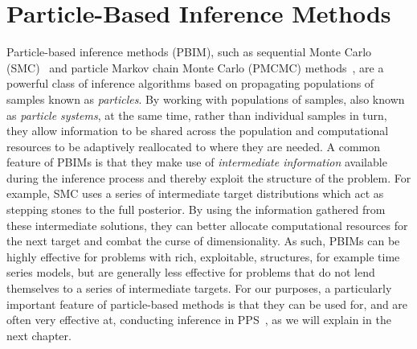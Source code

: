
\chapter{Particle-Based Inference Methods}
\label{chp:part}

Particle-based inference methods (PBIM), such as sequential Monte Carlo (SMC)~\citep{gordon1993novel,doucet2001introduction} and 
particle Markov chain Monte Carlo (PMCMC) methods~\citep{andrieu2009pseudo,rainforth2016interacting},
are a powerful class of inference algorithms based on propagating populations of samples
known as \emph{particles}.  By working with populations of samples, also known as \emph{particle systems},
 at the same time, rather than individual
samples in turn, they allow information to be shared across the population and computational
resources to be adaptively reallocated to where they are needed.  A common feature of PBIMs is
that they make use of \emph{intermediate information} available during the inference process and thereby
exploit the structure of the problem.  For example, SMC uses a series of intermediate target distributions
which act as stepping stones to the full posterior.  By using the information gathered from these intermediate
solutions, they can better allocate computational resources for the next target and combat the curse of
dimensionality.  As such, PBIMs can be highly effective for problems with rich, exploitable, structures, 
for example time series models, but are generally less effective for problems that do not lend themselves
to a series of intermediate targets.  For our purposes, a particularly important feature of particle-based
methods is that they can be used for, and are often very effective at, conducting inference in PPS~\citep{wood2014new}, as we will
explain in the next chapter.





%
%
